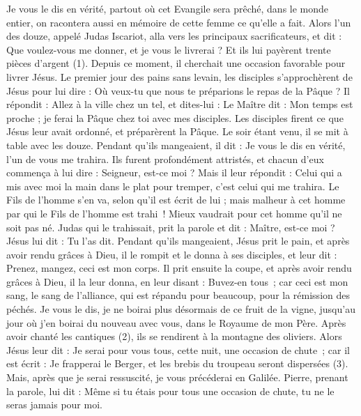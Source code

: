 \begin{multicols}{2}
{Je vous le dis en vérité, partout où cet Evangile sera prêché, dans le monde entier, on racontera aussi en mémoire de cette femme ce qu’elle a fait.
Alors l'un des douze, appelé Judas Iscariot, alla vers les principaux sacrificateurs,
et dit : Que voulez-vous me donner, et je vous le livrerai ? Et ils lui payèrent trente pièces d'argent (1).
Depuis ce moment, il cherchait une occasion favorable pour livrer Jésus.
Le premier jour des pains sans levain, les disciples s’approchèrent de Jésus pour lui dire : Où veux-tu que nous te préparions le repas de la Pâque ?
Il répondit : Allez à la ville chez un tel, et dites-lui : Le Maître dit : Mon temps est proche ; je ferai la Pâque chez toi avec mes disciples.
Les disciples firent ce que Jésus leur avait ordonné, et préparèrent la Pâque.
Le soir étant venu, il se mit à table avec les douze.
Pendant qu’ils mangeaient, il dit : Je vous le dis en vérité, l'un de vous me trahira.
Ils furent profondément attristés, et chacun d'eux commença à lui dire : Seigneur, est-ce moi ?
Mais il leur répondit : Celui qui a mis avec moi la main dans le plat pour tremper, c'est celui qui me trahira.
Le Fils de l'homme s'en va, selon qu'il est écrit de lui ; mais malheur à cet homme par qui le Fils de l'homme est trahi ! Mieux vaudrait pour cet homme qu’il ne soit pas né.
Judas qui le trahissait, prit la parole et dit : Maître, est-ce moi ? Jésus lui dit : Tu l'as dit.
Pendant qu’ils mangeaient, Jésus prit le pain, et après avoir rendu grâces à Dieu, il le rompit et le donna à ses disciples, et leur dit : Prenez, mangez, ceci est mon corps.
Il prit ensuite la coupe, et après avoir rendu grâces à Dieu, il la leur donna, en leur disant : Buvez-en tous ;
car ceci est mon sang, le sang de l’alliance, qui est répandu pour beaucoup, pour la rémission des péchés.
Je vous le dis, je ne boirai plus désormais de ce fruit de la vigne, jusqu'au jour où j’en boirai du nouveau avec vous, dans le Royaume de mon Père.
Après avoir chanté les cantiques (2), ils se rendirent à la montagne des oliviers.
Alors Jésus leur dit : Je serai pour vous tous, cette nuit, une occasion de chute ; car il est écrit : Je frapperai le Berger, et les brebis du troupeau seront dispersées (3).
Mais, après que je serai ressuscité, je vous précéderai en Galilée.
Pierre, prenant la parole, lui dit : Même si tu étais pour tous une occasion de chute, tu ne le seras jamais pour moi.
}
\end{multicols}
